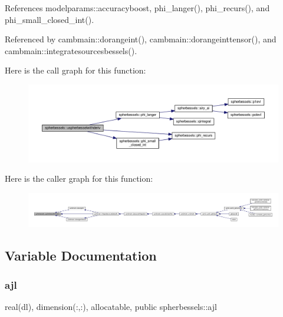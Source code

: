 References modelparams\+::accuracyboost, phi\+\_\+langer(), phi\+\_\+recurs(), and phi\+\_\+small\+\_\+closed\+\_\+int().



Referenced by cambmain\+::dorangeint(), cambmain\+::dorangeinttensor(), and cambmain\+::integratesourcesbessels().

Here is the call graph for this function\+:
\nopagebreak
\begin{figure}[H]
\begin{center}
\leavevmode
\includegraphics[width=350pt]{namespacespherbessels_a19f6db59afef649058999b63f9ab8f65_cgraph}
\end{center}
\end{figure}
Here is the caller graph for this function\+:
\nopagebreak
\begin{figure}[H]
\begin{center}
\leavevmode
\includegraphics[width=350pt]{namespacespherbessels_a19f6db59afef649058999b63f9ab8f65_icgraph}
\end{center}
\end{figure}


\subsection{Variable Documentation}
\mbox{\label{namespacespherbessels_ad90cf19f2544f8107ae70ec1b4cd64e0}} 
\subsubsection{\texorpdfstring{ajl}{ajl}}
{\footnotesize\ttfamily real(dl), dimension(\+:,\+:), allocatable, public spherbessels\+::ajl}



